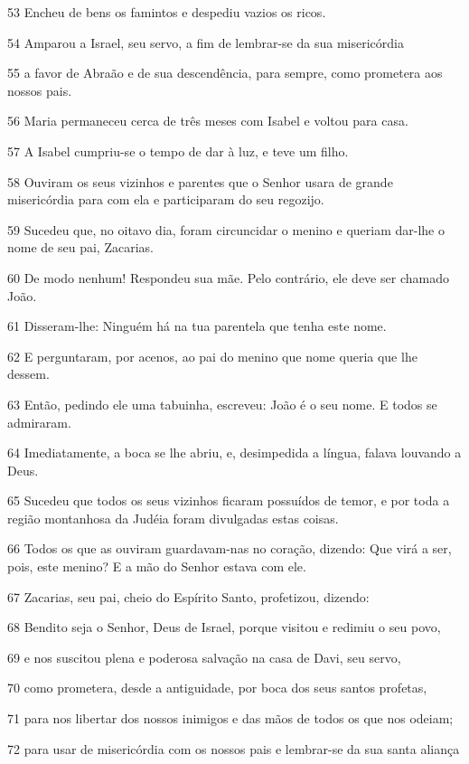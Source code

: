 \par 53 Encheu de bens os famintos e despediu vazios os ricos.
\par 54 Amparou a Israel, seu servo, a fim de lembrar-se da sua misericórdia
\par 55 a favor de Abraão e de sua descendência, para sempre, como prometera aos nossos pais.
\par 56 Maria permaneceu cerca de três meses com Isabel e voltou para casa.
\par 57 A Isabel cumpriu-se o tempo de dar à luz, e teve um filho.
\par 58 Ouviram os seus vizinhos e parentes que o Senhor usara de grande misericórdia para com ela e participaram do seu regozijo.
\par 59 Sucedeu que, no oitavo dia, foram circuncidar o menino e queriam dar-lhe o nome de seu pai, Zacarias.
\par 60 De modo nenhum! Respondeu sua mãe. Pelo contrário, ele deve ser chamado João.
\par 61 Disseram-lhe: Ninguém há na tua parentela que tenha este nome.
\par 62 E perguntaram, por acenos, ao pai do menino que nome queria que lhe dessem.
\par 63 Então, pedindo ele uma tabuinha, escreveu: João é o seu nome. E todos se admiraram.
\par 64 Imediatamente, a boca se lhe abriu, e, desimpedida a língua, falava louvando a Deus.
\par 65 Sucedeu que todos os seus vizinhos ficaram possuídos de temor, e por toda a região montanhosa da Judéia foram divulgadas estas coisas.
\par 66 Todos os que as ouviram guardavam-nas no coração, dizendo: Que virá a ser, pois, este menino? E a mão do Senhor estava com ele.
\par 67 Zacarias, seu pai, cheio do Espírito Santo, profetizou, dizendo:
\par 68 Bendito seja o Senhor, Deus de Israel, porque visitou e redimiu o seu povo,
\par 69 e nos suscitou plena e poderosa salvação na casa de Davi, seu servo,
\par 70 como prometera, desde a antiguidade, por boca dos seus santos profetas,
\par 71 para nos libertar dos nossos inimigos e das mãos de todos os que nos odeiam;
\par 72 para usar de misericórdia com os nossos pais e lembrar-se da sua santa aliança
